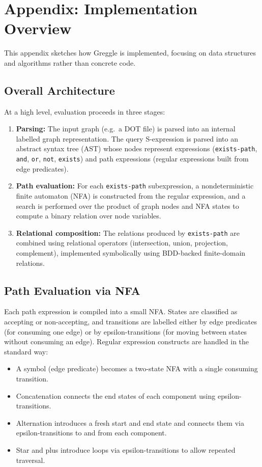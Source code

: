 \documentclass[11pt]{article}
\begin{document}
\appendix
\section*{Appendix: Implementation Overview}

This appendix sketches how Greggle is implemented, focusing on data
structures and algorithms rather than concrete code.

\subsection*{Overall Architecture}

At a high level, evaluation proceeds in three stages:
\begin{enumerate}[leftmargin=*]
  \item \textbf{Parsing:} The input graph (e.g.\ a DOT file) is parsed
        into an internal labelled graph representation.  The query
        S-expression is parsed into an abstract syntax tree (AST)
        whose nodes represent expressions (\texttt{exists-path},
        \texttt{and}, \texttt{or}, \texttt{not}, \texttt{exists}) and
        path expressions (regular expressions built from edge
        predicates).
  \item \textbf{Path evaluation:} For each \texttt{exists-path}
        subexpression, a nondeterministic finite automaton (NFA) is
        constructed from the regular expression, and a search is
        performed over the product of graph nodes and NFA states to
        compute a binary relation over node variables.
  \item \textbf{Relational composition:} The relations produced by
        \texttt{exists-path} are combined using relational operators
        (intersection, union, projection, complement), implemented
        symbolically using BDD-backed finite-domain relations.
\end{enumerate}

\subsection*{Path Evaluation via NFA}

Each path expression is compiled into a small NFA.  States are
classified as accepting or non-accepting, and transitions are labelled
either by edge predicates (for consuming one edge) or by
epsilon-transitions (for moving between states without consuming an
edge).  Regular expression constructs are handled in the standard
way:
\begin{itemize}[leftmargin=*]
  \item A symbol (edge predicate) becomes a two-state NFA with a single
        consuming transition.
  \item Concatenation connects the end states of each component
        using epsilon-transitions.
  \item Alternation introduces a fresh start and end state and connects
        them via epsilon-transitions to and from each component.
  \item Star and plus introduce loops via epsilon-transitions to allow
        repeated traversal.
\end{itemize}
\end{document}
